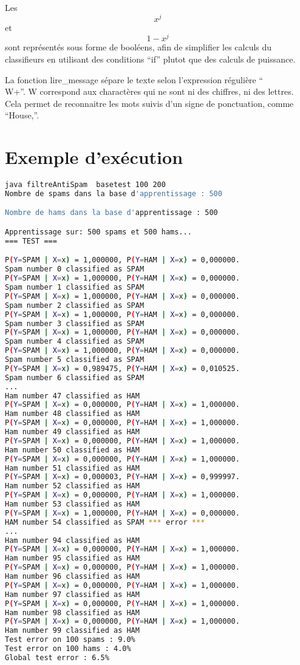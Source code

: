 \documentclass[a4paper, 11pt]{article}
\begin{document}
Les \[ x^j \] et \[ 1- x^j \] sont représentés sous forme de booléens, afin de simplifier les calculs du classifieurs en utilisant des conditions ``if'' plutot que des calculs de puissance.

La fonction lire\_message sépare le texte selon l'expression régulière ``\\ W+''. W correspond aux charactères qui ne sont ni des chiffres, ni des lettres. Cela permet de reconnaitre les mots suivis d'un signe de ponctuation, comme ``House,''.

\section{Exemple d'exécution}

\begin{lstlisting}[language=bash]
java filtreAntiSpam  basetest 100 200
Nombre de spams dans la base d'apprentissage : 500   

Nombre de hams dans la base d'apprentissage : 500

Apprentissage sur: 500 spams et 500 hams...
=== TEST ===

P(Y=SPAM | X=x) = 1,000000, P(Y=HAM | X=x) = 0,000000.
Spam number 0 classified as SPAM
P(Y=SPAM | X=x) = 1,000000, P(Y=HAM | X=x) = 0,000000.
Spam number 1 classified as SPAM
P(Y=SPAM | X=x) = 1,000000, P(Y=HAM | X=x) = 0,000000.
Spam number 2 classified as SPAM
P(Y=SPAM | X=x) = 1,000000, P(Y=HAM | X=x) = 0,000000.
Spam number 3 classified as SPAM
P(Y=SPAM | X=x) = 1,000000, P(Y=HAM | X=x) = 0,000000.
Spam number 4 classified as SPAM
P(Y=SPAM | X=x) = 1,000000, P(Y=HAM | X=x) = 0,000000.
Spam number 5 classified as SPAM
P(Y=SPAM | X=x) = 0,989475, P(Y=HAM | X=x) = 0,010525.
Spam number 6 classified as SPAM
...
Ham number 47 classified as HAM
P(Y=SPAM | X=x) = 0,000000, P(Y=HAM | X=x) = 1,000000.
Ham number 48 classified as HAM
P(Y=SPAM | X=x) = 0,000000, P(Y=HAM | X=x) = 1,000000.
Ham number 49 classified as HAM
P(Y=SPAM | X=x) = 0,000000, P(Y=HAM | X=x) = 1,000000.
Ham number 50 classified as HAM
P(Y=SPAM | X=x) = 0,000000, P(Y=HAM | X=x) = 1,000000.
Ham number 51 classified as HAM
P(Y=SPAM | X=x) = 0,000003, P(Y=HAM | X=x) = 0,999997.
Ham number 52 classified as HAM
P(Y=SPAM | X=x) = 0,000000, P(Y=HAM | X=x) = 1,000000.
Ham number 53 classified as HAM
P(Y=SPAM | X=x) = 1,000000, P(Y=HAM | X=x) = 0,000000.
HAM number 54 classified as SPAM *** error ***
...
Ham number 94 classified as HAM
P(Y=SPAM | X=x) = 0,000000, P(Y=HAM | X=x) = 1,000000.
Ham number 95 classified as HAM
P(Y=SPAM | X=x) = 0,000000, P(Y=HAM | X=x) = 1,000000.
Ham number 96 classified as HAM
P(Y=SPAM | X=x) = 0,000000, P(Y=HAM | X=x) = 1,000000.
Ham number 97 classified as HAM
P(Y=SPAM | X=x) = 0,000000, P(Y=HAM | X=x) = 1,000000.
Ham number 98 classified as HAM
P(Y=SPAM | X=x) = 0,000000, P(Y=HAM | X=x) = 1,000000.
Ham number 99 classified as HAM
Test error on 100 spams : 9.0%
Test error on 100 hams : 4.0%
Global test error : 6.5%
\end{lstlisting}
\end{document}
